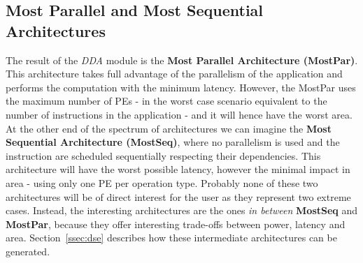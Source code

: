 \subsection{Most Parallel and Most Sequential Architectures}
\vspace{-1mm}
The result of the \textit{DDA} module is the \textbf{Most Parallel Architecture (MostPar)}. This architecture takes full advantage of the parallelism of the application and performs the computation with the minimum latency. However, the MostPar uses the maximum number of PEs - in the worst case scenario equivalent to the number of instructions in the application - and it will hence have the worst area.
At the other end of the spectrum of architectures we can imagine the \textbf{Most Sequential Architecture (MostSeq)}, where no parallelism is used and the instruction are scheduled sequentially respecting their dependencies. This architecture will have the worst possible latency, however the minimal impact in area - using only one PE per operation type.
Probably none of these two architectures will be of direct interest for the user as they represent two extreme cases. Instead, the interesting architectures are the ones \textit{in between} \textbf{MostSeq} and \textbf{MostPar}, because they offer interesting trade-offs between power, latency and area. Section~\ref{ssec:dse} describes how these intermediate architectures can be generated.

